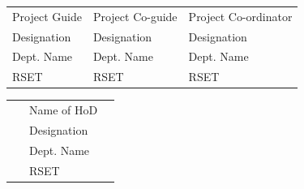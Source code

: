\begin{flushleft}


	\begin{longtable}{p{5.8cm} p{5.8cm} p{5.8cm}}
		{Project Guide} & {Project Co-guide} & {Project Co-ordinator} \\
		{Designation}   & {Designation}      & {Designation}          \\
		{Dept. Name}    & {Dept. Name}       & {Dept. Name}           \\
		{RSET} ~        & {RSET}             & {RSET}                 \\
	\end{longtable}
\end{flushleft}

\vspace{2cm}

\begin{flushleft}


	\begin{longtable}{p{5.8cm} p{5.8cm} p{5.8cm}}
		{}   & {Name of HoD} & {} \\
		{}   & {Designation} & {} \\
		{}   & {Dept. Name}  & {} \\
		{} ~ & {RSET}        & {} \\
	\end{longtable}
\end{flushleft}


%	
%	
%		
